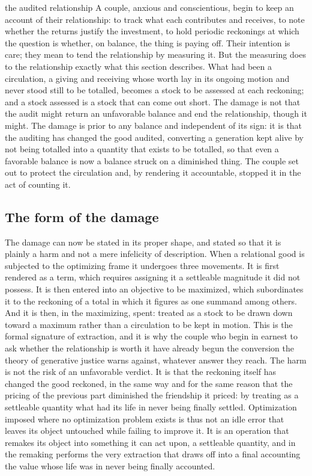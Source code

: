 \begin{casebox}{the audited relationship}
A couple, anxious and conscientious, begin to keep an account of their relationship: to track what each contributes and receives, to note whether the returns justify the investment, to hold periodic reckonings at which the question is whether, on balance, the thing is paying off. Their intention is care; they mean to tend the relationship by measuring it. But the measuring does to the relationship exactly what this section describes. What had been a circulation, a giving and receiving whose worth lay in its ongoing motion and never stood still to be totalled, becomes a stock to be assessed at each reckoning; and a stock assessed is a stock that can come out short. The damage is not that the audit might return an unfavorable balance and end the relationship, though it might. The damage is prior to any balance and independent of its sign: it is that the auditing has changed the good audited, converting a generation kept alive by not being totalled into a quantity that exists to be totalled, so that even a favorable balance is now a balance struck on a diminished thing. The couple set out to protect the circulation and, by rendering it accountable, stopped it in the act of counting it.
\end{casebox}

\subsection*{The form of the damage}

The damage can now be stated in its proper shape, and stated so that it is plainly a harm and not a mere infelicity of description. When a relational good is subjected to the optimizing frame it undergoes three movements. It is first rendered as a term, which requires assigning it a settleable magnitude it did not possess. It is then entered into an objective to be maximized, which subordinates it to the reckoning of a total in which it figures as one summand among others. And it is then, in the maximizing, spent: treated as a stock to be drawn down toward a maximum rather than a circulation to be kept in motion. This is the formal signature of extraction, and it is why the couple who begin in earnest to ask whether the relationship is worth it have already begun the conversion the theory of generative justice warns against, whatever answer they reach. The harm is not the risk of an unfavorable verdict. It is that the reckoning itself has changed the good reckoned, in the same way and for the same reason that the pricing of the previous part diminished the friendship it priced: by treating as a settleable quantity what had its life in never being finally settled. Optimization imposed where no optimization problem exists is thus not an idle error that leaves its object untouched while failing to improve it. It is an operation that remakes its object into something it can act upon, a settleable quantity, and in the remaking performs the very extraction that draws off into a final accounting the value whose life was in never being finally accounted.
